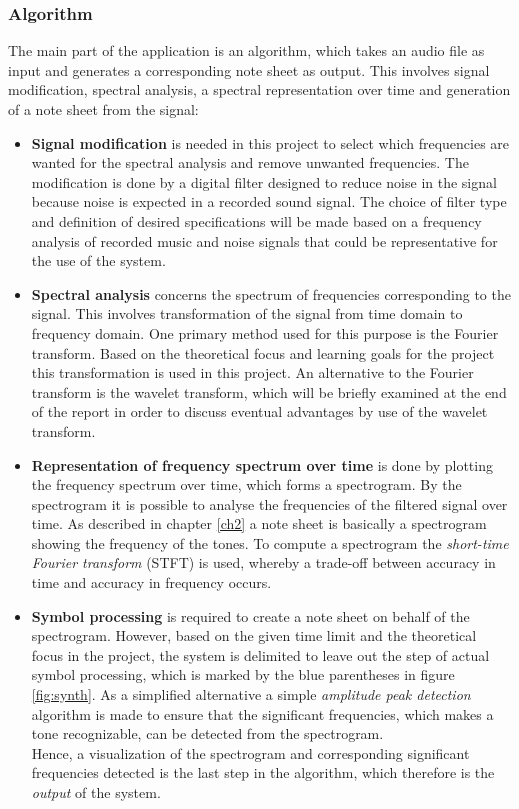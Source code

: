 \subsubsection{Algorithm}
The main part of the application is an algorithm, which takes an audio file as input and generates a corresponding note sheet as output. This involves signal modification, spectral analysis, a spectral representation over time and generation of a note sheet from the signal:
\begin{itemize}
\item[] \textbf{Signal modification} is needed in this project to select which frequencies are wanted for the spectral analysis and remove unwanted frequencies. The modification is done by a digital filter designed to reduce noise in the signal because noise is expected in a recorded sound signal. The choice of filter type and definition of desired specifications will be made based on a frequency analysis of recorded music and noise signals that could be representative for the use of the system.

\item[] \textbf{Spectral analysis} concerns the spectrum of frequencies corresponding to the signal. This involves transformation of the signal from time domain to frequency domain.
One primary method used for this purpose is the Fourier transform. Based on the theoretical focus and learning goals for the project this transformation is used in this project. An alternative to the Fourier transform is the wavelet transform, which will be briefly examined at the end of the report in order to discuss eventual advantages by use of the wavelet transform.    

\item[] \textbf{Representation of frequency spectrum over time} is done by plotting the frequency spectrum over time, which forms a spectrogram. By the spectrogram it is possible to analyse the frequencies of the filtered signal over time. As described in chapter \ref{ch2} a note sheet is basically a spectrogram showing the frequency of the tones. To compute a spectrogram the \textit{short-time Fourier transform} (STFT) is used, whereby a trade-off between accuracy in time and accuracy in frequency occurs.  

\item[] \textbf{Symbol processing} is required to create a note sheet on behalf of the spectrogram. 
However, based on the given time limit and the theoretical focus in the project, the system is delimited to leave out the step of actual symbol processing, which is marked by the blue parentheses in figure \ref{fig:synth}. As a simplified alternative a simple \textit{amplitude peak detection} algorithm is made to ensure that the significant frequencies, which makes a tone recognizable, can be detected from the spectrogram. \\       
Hence, a visualization of the spectrogram and corresponding significant frequencies detected is the last step in the algorithm, which therefore is the \textit{output} of the system.
\end{itemize}

